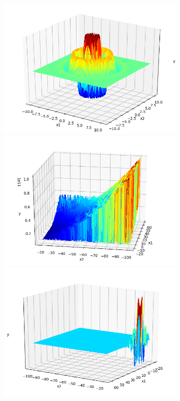 \documentclass[a4paper,13pt,2p]{report}
\begin{document}
\begin{figure}[!ht]
\begin{subfigure}{0.24\textwidth}
  	\includegraphics[width=1\linewidth]{png/functions/islo_hybrid_F19}
  	\includegraphics[width=1\linewidth]{png/functions/islo_hybrid_F21}
  	\includegraphics[width=1\linewidth]{png/functions/islo_hybrid_F22}

\end{subfigure}
\end{figure}
\end{document}
